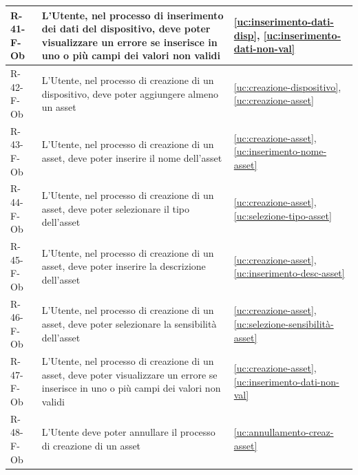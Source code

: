 ﻿\documentclass[a4paper,12pt]{article}
\begin{document}
{{\begin{longtable}{|l|p{}|p{}|}
            R-41-F-Ob       & L'Utente, nel processo di inserimento dei dati del dispositivo, deve poter visualizzare un errore se inserisce in uno o più campi dei valori non validi                                     & \ref{uc:inserimento-dati-disp}, \ref{uc:inserimento-dati-non-val}                 \\ \hline
            R-42-F-Ob       & L'Utente, nel processo di creazione di un dispositivo, deve poter aggiungere almeno un asset                                                                                                & \ref{uc:creazione-dispositivo}, \ref{uc:creazione-asset}                     \\ \hline
            R-43-F-Ob       & L'Utente, nel processo di creazione di un asset, deve poter inserire il nome dell'asset                                                                                                     & \ref{uc:creazione-asset}, \ref{uc:inserimento-nome-asset}                 \\ \hline
            R-44-F-Ob       & L'Utente, nel processo di creazione di un asset, deve poter selezionare il tipo dell'asset                                                                                                  & \ref{uc:creazione-asset}, \ref{uc:selezione-tipo-asset}                 \\ \hline
            R-45-F-Ob       & L'Utente, nel processo di creazione di un asset, deve poter inserire la descrizione dell'asset                                                                                              & \ref{uc:creazione-asset}, \ref{uc:inserimento-desc-asset}                 \\ \hline
            R-46-F-Ob       & L'Utente, nel processo di creazione di un asset, deve poter selezionare la sensibilità dell'asset                                                                                           & \ref{uc:creazione-asset}, \ref{uc:selezione-sensibilità-asset}                 \\ \hline
            R-47-F-Ob       & L'Utente, nel processo di creazione di un asset, deve poter visualizzare un errore se inserisce in uno o più campi dei valori non validi                                                    & \ref{uc:creazione-asset}, \ref{uc:inserimento-dati-non-val}                     \\ \hline
            R-48-F-Ob       & L'Utente deve poter annullare il processo di creazione di un asset                                                                                                                          & \ref{uc:annullamento-creaz-asset}                                               \\ \hline

\end{longtable}}}
\end{document}

